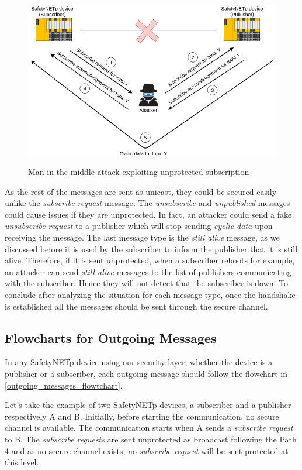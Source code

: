 \begin{figure}[H]
\centering
\includegraphics[height=7.5cm]{figures/design/man_in_the_middle_attack.png}
\caption{Man in the middle attack exploiting unprotected subscription}\label{man_in_the_middle_attack_exploiting_unprotected_subsribtion}
\end{figure}

As the rest of the messages are sent as unicast, they could be secured easily unlike the \textit{subscribe request} message.
The \textit{unsubscribe} and \textit{unpublished} messages could cause
issues if they are unprotected. In fact, an attacker could send a fake \textit{unsubscribe request} to a publisher
which will stop sending \textit{cyclic data} upon receiving the message. The last message type is the \textit{still alive} message,
as we discussed before it is used by the subscriber to inform the publisher that it is still alive. Therefore,
if it is sent unprotected, when a subscriber reboots for example, an attacker can send \textit{still alive} messages
to the list of publishers communicating with the subscriber. Hence they will not detect that the subscriber is down.
To conclude after analyzing the situation for each message type, once the handshake is established all
the messages should be sent through the secure channel.

\subsection{Flowcharts for Outgoing Messages}

In any SafetyNETp device using our security layer, whether the device is a publisher or a subscriber,
each outgoing message should follow the flowchart in \autoref{outgoing_messages_flowtchart}.

Let's take the example of two SafetyNETp devices, a subscriber
and a publisher respectively A and B. Initially, before starting the communication, no secure channel is available.
The communication starts when A sends a \textit{subscribe request} to B. The \textit{subscribe requests} are sent
unprotected as broadcast following the Path 4 and as no secure channel exists, no \textit{subscribe request} will be sent protected at this level.

